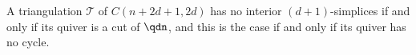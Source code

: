 \begin{theorem}\label{thm:interior}
A triangulation $\mathcal{T}$ of $C(n + 2d + 1, 2d)$ has no interior $(d+1)$-simplices if and only if its quiver is a cut of $\qdn$, and this is the case if and only if its quiver has no cycle.
\end{theorem}
